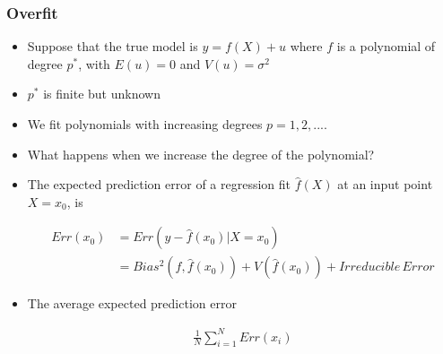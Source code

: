 \documentclass[
  shownotes,
  xcolor={svgnames},
  hyperref={colorlinks,citecolor=DarkBlue,linkcolor=DarkRed,urlcolor=DarkBlue}
  ]{beamer}
\begin{document}
\begin{frame}[fragile]
\frametitle{Overfit}


\begin{itemize}

  \item Suppose that the true model is $y=f(X) +u$ where $f$ is a polynomial of degree $p^*$, with $E(u)=0$ and $V(u)=\sigma^2$
  \medskip
  \item $p^*$ is finite but unknown
  \medskip
  \item  We fit polynomials with increasing degrees $p=1,2,....$
  \medskip
  \item What happens when we increase the degree of the polynomial?
  \medskip
  \item The expected prediction error of a regression fit $\hat f(X)$ at an input point $X=x_0$, is

  \begin{align}
  Err(x_0)&=Err(y-\hat f(x_0)|X=x_0) \nonumber \\
          &= Bias^2 (f,\hat f(x_0)) + V(\hat f(x_0)) + Irreducible\,Error
  \end{align}
\item The average expected prediction error

\begin{flushleft}
\begin{align}
  \frac{1}{N} \sum _{i=1}^N Err(x_i) 
  \end{align}
\end{flushleft}
  
\end{itemize}

\end{frame}
\end{document}
